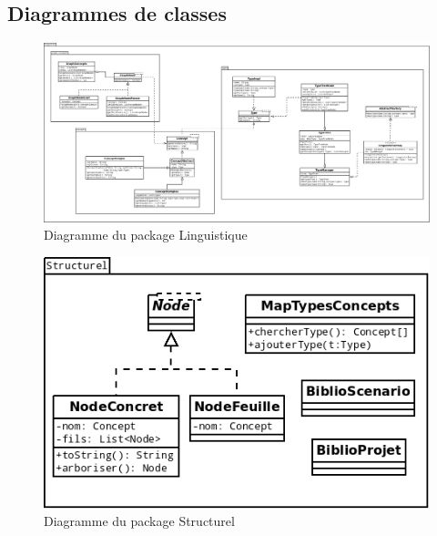 \documentclass[12pt]{report}
\begin{document}
\subsection{Diagrammes de classes}

\begin{figure}[h!]
\begin{center}
\includegraphics[scale=0.5]{DiagLinguistique.png}
\caption{Diagramme du package Linguistique}
\end{center}
\end{figure}


\begin{figure}[h!]
\begin{center}
\includegraphics[scale=0.5]{DiagStructurel.png}
\caption{Diagramme du package Structurel}
\end{center}
\end{figure}
\end{document}
